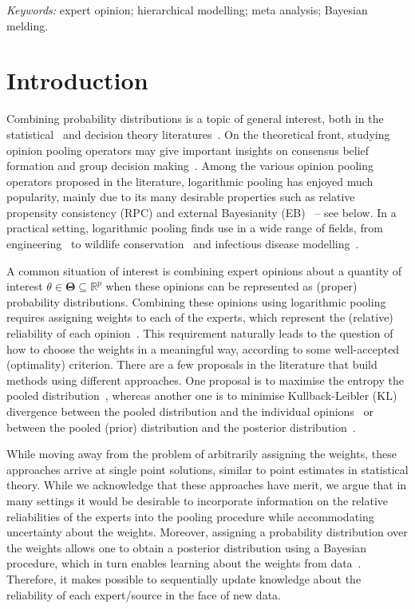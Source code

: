 \documentclass[12pt]{article}
\begin{document}
\noindent%
{\it Keywords:} expert opinion; hierarchical modelling;  meta analysis; Bayesian melding.
\vfill

\newpage
{} %

\section{Introduction}
\label{sec:intro}

Combining probability distributions is a topic of general interest, both in the statistical~\parencite{West1984, Genest1986A, Genest1986B} and decision theory literatures~\parencite{Genest1984,French1985,Pennock1997,Guardoni2002}.
On the theoretical front, studying opinion pooling operators may give important insights on consensus belief formation and group decision making~\parencite{West1984,Genest1986B,Guardoni2002}.
Among the various opinion pooling operators proposed in the literature, logarithmic pooling has enjoyed much popularity, mainly due to its many desirable properties such as relative propensity consistency (RPC) and external Bayesianity (EB)~\parencite{Genest1986A} -- see below. 
In a practical setting, logarithmic pooling finds use in a wide range of fields, from engineering~\parencite{Lind1988,Savchuk1994} to wildlife conservation~\parencite{Poole2000} and infectious disease modelling~\parencite{Coelho2009}. 

A common situation of interest is combining expert opinions about a quantity of interest $\theta \in \mathbf{\Theta} \subseteq \mathbb{R}^p$ when these opinions can be represented as (proper) probability distributions.
Combining these opinions using logarithmic pooling requires assigning weights to each of the experts, which represent the (relative) reliability of each opinion~\parencite{Genest1984,French1985}.
This requirement naturally leads to the question of how to choose the weights in a meaningful way, according to some well-accepted (optimality) criterion.
There are a few proposals in the literature that build methods using different approaches.
One proposal is to maximise the entropy the pooled distribution~\parencite{Myung1996}, whereas another one is to minimise Kullback-Leibler (KL) divergence between the pooled distribution and the individual opinions~\parencite{Abbas2009} or between the pooled (prior) distribution and the posterior distribution~\parencite{Rufo2012A,Rufo2012B}.

While moving away from the problem of arbitrarily assigning the weights, these approaches arrive at single point solutions, similar to point estimates in statistical theory.
While we acknowledge that these approaches have merit, we argue that in many settings it would be desirable to incorporate  information on the relative reliabilities of the experts into the pooling procedure while accommodating uncertainty about the weights.
Moreover, assigning a probability distribution over the weights allows one to obtain a posterior distribution using a Bayesian procedure, which in turn enables learning about the weights from data~\parencite{Poole2000}.
Therefore, it makes possible to sequentially update knowledge about the reliability of each expert/source in the face of new data.
\end{document}
